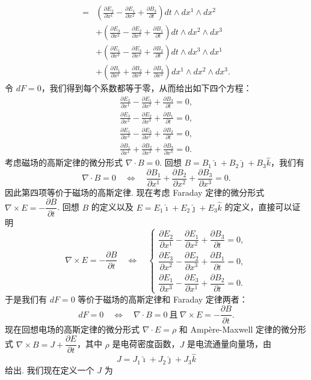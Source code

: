 \[\begin{aligned}
={}&\left(\frac{\partial E_2}{\partial x^1}-\frac{\partial E_1}{\partial x^2}+\frac{\partial B_3}{\partial t}\right)dt\wedge dx^1\wedge dx^2\\
&+\left(\frac{\partial E_3}{\partial x^2}-\frac{\partial E_2}{\partial x^3}+\frac{\partial B_1}{\partial t}\right)dt\wedge dx^2\wedge dx^3\\
&+\left(\frac{\partial E_1}{\partial x^3}-\frac{\partial E_3}{\partial x^1}+\frac{\partial B_2}{\partial t}\right)dt\wedge dx^3\wedge dx^1\\
&+\left(\frac{\partial B_1}{\partial x^1}+\frac{\partial B_2}{\partial x^2}+\frac{\partial B_3}{\partial x^3}\right)dx^1\wedge dx^2\wedge dx^3 .
\end{aligned}
\]
令 $dF=0$，我们得到每个系数都等于零，从而给出如下四个方程：
\begin{align*}
\frac{\partial E_2}{\partial x^1}-\frac{\partial E_1}{\partial x^2}+\frac{\partial B_3}{\partial t}=0, \\
\frac{\partial E_3}{\partial x^2}-\frac{\partial E_2}{\partial x^3}+\frac{\partial B_1}{\partial t}=0, \\
\frac{\partial E_1}{\partial x^3}-\frac{\partial E_3}{\partial x^1}+\frac{\partial B_2}{\partial t}=0, \\
\frac{\partial B_1}{\partial x^1}+\frac{\partial B_2}{\partial x^2}+\frac{\partial B_3}{\partial x^3}=0 .
\end{align*}
考虑磁场的高斯定律的微分形式 $\nabla\cdot B=0$. 回想 $B=B_1\hat{\imath}+B_2\hat{\jmath}+B_3\hat{k}$，我们有
\[
\nabla\cdot B=0\quad\Longleftrightarrow\quad\frac{\partial B_1}{\partial x^1}+\frac{\partial B_2}{\partial x^2}+\frac{\partial B_3}{\partial x^3}=0 .
\]
因此第四项等价于磁场的高斯定律. 现在考虑 Faraday 定律的微分形式 $\nabla\times E=-\dfrac{\partial B}{\partial t}$. 回想 $B$ 的定义以及 $E=E_1\hat{\imath}+E_2\hat{\jmath}+E_3\hat{k}$ 的定义，直接可以证明
\[
\nabla\times E=-\frac{\partial B}{\partial t}\quad\Longleftrightarrow\quad
\begin{cases}
\dfrac{\partial E_2}{\partial x^1}-\dfrac{\partial E_1}{\partial x^2}+\dfrac{\partial B_3}{\partial t}=0,\\[4pt]
\dfrac{\partial E_3}{\partial x^2}-\dfrac{\partial E_2}{\partial x^3}+\dfrac{\partial B_1}{\partial t}=0,\\[4pt]
\dfrac{\partial E_1}{\partial x^3}-\dfrac{\partial E_3}{\partial x^1}+\dfrac{\partial B_2}{\partial t}=0 .
\end{cases}
\]
于是我们有 $dF=0$ 等价于磁场的高斯定律和 Faraday 定律两者：
\[
dF=0\quad\Longleftrightarrow\quad\nabla\cdot B=0\ \text{且}\ \nabla\times E=-\frac{\partial B}{\partial t}.
\]
现在回想电场的高斯定律的微分形式 $\nabla\cdot E=\rho$ 和 Ampère-Maxwell 定律的微分形式 $\nabla\times B=J+\dfrac{\partial E}{\partial t}$，其中 $\rho$ 是电荷密度函数，$J$ 是电流通量向量场，由
\[
J=J_1\hat{\imath}+J_2\hat{\jmath}+J_3\hat{k}
\]
给出. 我们现在定义一个 $J$ 为

